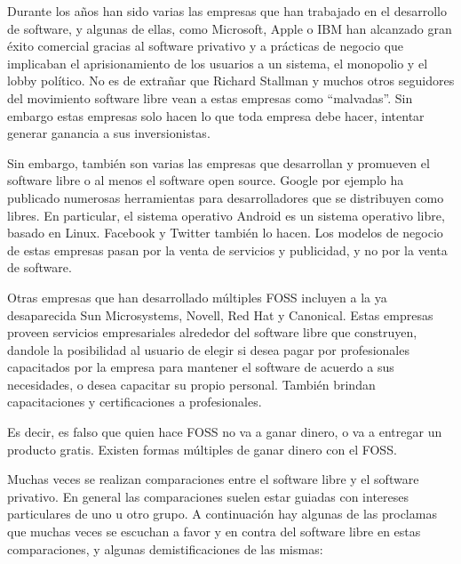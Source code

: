 Durante los años han sido varias las empresas que han trabajado en el desarrollo
de software, y algunas de ellas, como Microsoft, Apple o IBM han alcanzado gran
éxito comercial gracias al software privativo y a prácticas de negocio que
implicaban el aprisionamiento de los usuarios a un sistema, el monopolio y el
lobby político. No es de extrañar que Richard Stallman y muchos otros seguidores
del movimiento software libre vean a estas empresas como ``malvadas''. Sin
embargo estas empresas solo hacen lo que toda empresa debe hacer, intentar
generar ganancia a sus inversionistas.

Sin embargo, también son varias las empresas que desarrollan y promueven el
software libre o al menos el software open source. Google por ejemplo ha publicado
numerosas herramientas para desarrolladores que se distribuyen como libres. En
particular, el sistema operativo Android es un sistema operativo libre, basado
en Linux. Facebook y Twitter también lo hacen. Los modelos de negocio de estas
empresas pasan por la venta de servicios y publicidad, y no por la venta de software.

Otras empresas que han desarrollado múltiples FOSS incluyen a la ya desaparecida
Sun Microsystems, Novell, Red Hat y Canonical. Estas empresas proveen servicios
empresariales alrededor del software libre que construyen, dandole la posibilidad
al usuario de elegir si desea pagar por profesionales capacitados por la empresa
para mantener el software de acuerdo a sus necesidades, o desea capacitar su
propio personal. También brindan capacitaciones y certificaciones a profesionales.

Es decir, es falso que quien hace FOSS no va a ganar dinero, o va a entregar un
producto gratis. Existen formas múltiples de ganar dinero con el FOSS.

Muchas veces se realizan comparaciones entre el software libre y el software
privativo. En general las comparaciones suelen estar guiadas con intereses
particulares de uno u otro grupo. A continuación hay algunas de las proclamas
que muchas veces se escuchan a favor y en contra del software libre en estas
comparaciones, y algunas demistificaciones de las mismas:

